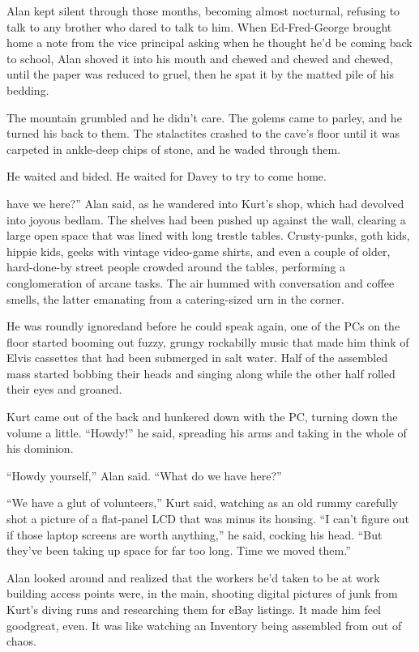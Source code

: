 Alan kept silent through those months, becoming almost nocturnal,
refusing to talk to any brother who dared to talk to him.  When
Ed-Fred-George brought home a note from the vice principal asking when
he thought he'd be coming back to school, Alan shoved it into his
mouth and chewed and chewed and chewed, until the paper was reduced to
gruel, then he spat it by the matted pile of his bedding.

The mountain grumbled and he didn't care.  The golems came to parley,
and he turned his back to them.  The stalactites crashed to the cave's
floor until it was carpeted in ankle-deep chips of stone, and he waded
through them.

He waited and bided.  He waited for Davey to try to come home.

have we here?'' Alan said, as he wandered into Kurt's shop,
which had devolved into joyous bedlam.  The shelves had been pushed up
against the wall, clearing a large open space that was lined with long
trestle tables.  Crusty-punks, goth kids, hippie kids, geeks with
vintage video-game shirts, and even a couple of older, hard-done-by
street people crowded around the tables, performing a conglomeration
of arcane tasks.  The air hummed with conversation and coffee smells,
the latter emanating from a catering-sized urn in the corner.

He was roundly ignored\dash{}and before he could speak again, one of the
PCs on the floor started booming out fuzzy, grungy rockabilly music
that made him think of Elvis cassettes that had been submerged in salt
water.  Half of the assembled mass started bobbing their heads and
singing along while the other half rolled their eyes and groaned.

Kurt came out of the back and hunkered down with the PC, turning down
the volume a little.  ``Howdy!'' he said, spreading his arms and
taking in the whole of his dominion.

``Howdy yourself,'' Alan said.  ``What do we have here?''

``We have a glut of volunteers,'' Kurt said, watching as an old rummy
carefully shot a picture of a flat-panel LCD that was minus its
housing.  ``I can't figure out if those laptop screens are worth
anything,'' he said, cocking his head.  ``But they've been taking up
space for far too long.  Time we moved them.''

Alan looked around and realized that the workers he'd taken to be at
work building access points were, in the main, shooting digital
pictures of junk from Kurt's diving runs and researching them for eBay
listings.  It made him feel good\dash{}great, even.  It was like watching
an Inventory being assembled from out of chaos.


